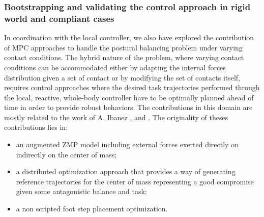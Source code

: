 \documentclass[final,5p,twocolumn]{elsarticle}
\begin{document}
\subsubsection{Bootstrapping and validating the control approach in rigid world and compliant cases}
In coordination with the local controller, we also have explored the contribution of MPC approaches to handle the postural balancing problem under varying contact conditions. The hybrid nature of the problem, where varying contact conditions can be accommodated either by adapting the internal forces distribution given a set of contact or by modifying the set of contacts itself, requires control approaches where the desired task trajectories performed through the local, reactive, whole-body controller have to be optimally planned ahead of time in order to provide robust behaviors. The contributions in this domain are mostly related to the work of A. Ibanez \cite{ibanez2013}, \cite{ibanez2014-icra} and \cite{ibanez2014-ark}. The originality of theses contributions lies in:
\begin{itemize}
	\item an augmented ZMP model including external forces exerted directly on indirectly on the center of mass;
	\item a distributed optimization approach that provides a way of generating reference trajectories for the center of mass representing a good compromise given some antagonistic balance and task;
	\item a non scripted foot step placement optimization.
\end{itemize}
\end{document}
